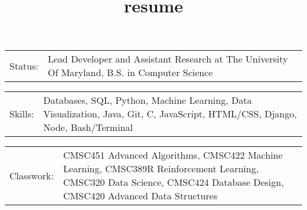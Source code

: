 \documentclass[10pt,a4paper]{article}
\title{resume}
\newcommand{\tzlarrow}{(0,0) -- (0.2,0) -- (0.3,0.2) -- (0.2,0.4) -- (0,0.4) -- (0.1,0.2) -- cycle;}
\newcommand{\larrow}[1]{
  \begin{tikzpicture}[scale=0.58]
    \filldraw[fill=#1!100,draw=#1!100!black]  \tzlarrow
  \end{tikzpicture}
}
\newcommand{\metasection}[2]{
  \begin{tabular*}{1\textwidth}{p{2.4cm} p{11cm}}
    \larrow{bgcol} \normalsize{\textcolor{sectcol}{#1}}&#2\\[1pt]
  \end{tabular*}
}
\begin{document}
\pagestyle{fancy}	


\vspace{-20pt}

\hspace{-0.25\linewidth}\colorbox{bgcol}{
}




\vspace{10pt}

\metasection{Status:}{Lead Developer and Assistant Research at The University Of Maryland, B.S. in Computer Science}
\metasection{Skills:}{Databases, SQL, Python, Machine Learning, Data Visualization, Java, Git, C, JavaScript, HTML/CSS, Django, Node, Bash/Terminal} 
\metasection{Classwork:}{CMSC451 Advanced Algorithms, CMSC422 Machine Learning, CMSC389R Reinforcement Learning, CMSC320 Data Science, CMSC424 Database Design, CMSC420 Advanced Data Structures}

\end{document}
